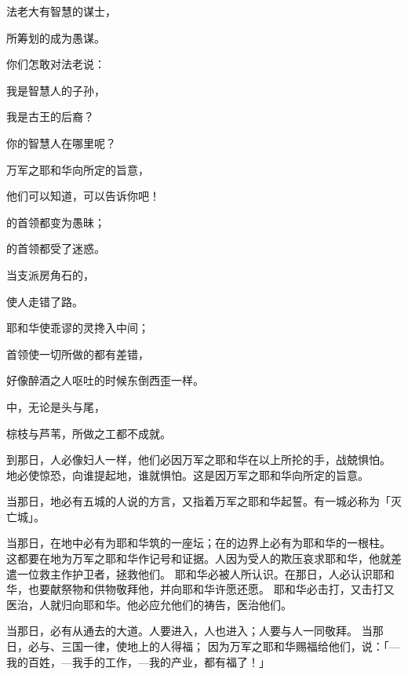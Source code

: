 {\par }{\Q 法老大有智慧的谋士，
\par }{\Q 所筹划的成为愚谋。
\par }{\Q 你们怎敢对法老说：
\par }{\Q 我是智慧人的子孙，
\par }{\Q 我是古王的后裔？
\par }{\Q {}你的智慧人在哪里呢？
\par }{\Q 万军之耶和华向{}所定的旨意，
\par }{\Q 他们可以知道，可以告诉你吧！
\par }{\Q {}的首领都变为愚昧；
\par }{的首领都受了迷惑。
\par }{\Q 当{}支派房角石的，
\par }{\Q 使{}人走错了路。
\par }{\Q {}耶和华使乖谬的灵搀入{}中间；
\par }{\Q 首领使{}一切所做的都有差错，
\par }{\Q 好像醉酒之人呕吐的时候东倒西歪一样。
\par }{\Q {}中，无论是头与尾，
\par }{\Q 棕枝与芦苇，所做之工都不成就。
\par }{\PP {}到那日，{}人必像妇人一样，他们必因万军之耶和华在{}以上所抡的手，战兢惧怕。
地必使{}惊恐，向谁提起{}地，谁就惧怕。这是因万军之耶和华向{}所定的旨意。
\par }{\PP {}当那日，{}地必有五城的人说{}的方言，又指着万军之耶和华起誓。有一城必称为「灭亡城」。
\par }{\PP {}当那日，在{}地中必有为耶和华筑的一座坛；在{}的边界上必有为耶和华{}的一根柱。
这都要在{}地为万军之耶和华作记号和证据。{}人因为受人的欺压哀求耶和华，他就差遣一位救主作护卫者，拯救他们。
耶和华必被{}人所认识。在那日，{}人必认识耶和华，也要献祭物和供物敬拜他，并向耶和华许愿还愿。
耶和华必击打{}，又击打又医治，{}人就归向耶和华。他必应允他们的祷告，医治他们。
\par }{\PP {}当那日，必有从{}通{}去的大道。{}人要进入{}，{}人也进入{}；{}人要与{}人一同敬拜{}。
当那日，{}必与{}、{}三国一律，使地上的人得福；
因为万军之耶和华赐福给他们，说：「{}—我的百姓，{}—我手的工作，{}—我的产业，都有福了！」

}
